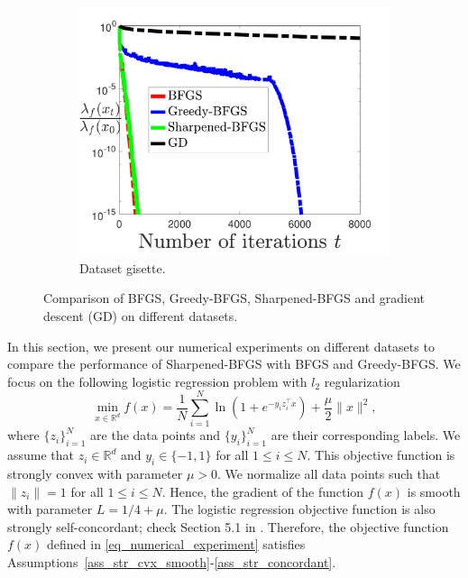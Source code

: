 \documentclass[11pt]{article}
\numberwithin{assumption}{section}
\numberwithin{remark}{section}
\numberwithin{theorem}{section}
\begin{document}
\begin{figure}
\begin{subfigure}{0.32\textwidth}
    \includegraphics[width=\textwidth]{Figures/gisette.pdf}
    \caption{Dataset gisette.}
\end{subfigure}
\caption{Comparison of BFGS, Greedy-BFGS, Sharpened-BFGS and gradient descent (GD) on different datasets.}
\label{all_plots}
\end{figure}

In this section, we present our numerical experiments on different datasets to compare the performance of Sharpened-BFGS with BFGS and Greedy-BFGS. We focus on the following logistic regression problem with $l_2$ regularization
\begin{equation}\label{eq_numerical_experiment}
    \min_{x \in \mathbb{R}^d} f(x) = \frac{1}{N}\sum_{i = 1}^{N}\ln{(1 + e^{-y_i z_i^\top x})} + \frac{\mu}{2}\|x\|^2,
\end{equation}
where $\{z_i\}_{i = 1}^{N}$ are the data points and $\{y_i\}_{i = 1}^{N}$ are their corresponding labels. We assume that $z_i \in \mathbb{R}^d$ and $y_i \in \{-1, 1\}$ for all $1 \leq i \leq N$. This objective function is strongly convex with parameter $\mu > 0$. We normalize all data points such that $\|z_i\| = 1$ for all $1 \leq i \leq N$. Hence, the gradient of the function $f(x)$ is smooth with parameter $L = 1/4 + \mu$. The logistic regression objective function is also strongly self-concordant; check Section 5.1 in \cite{rodomanov2020greedy}. Therefore, the objective function $f(x)$ defined in \eqref{eq_numerical_experiment} satisfies Assumptions~\ref{ass_str_cvx_smooth}-\ref{ass_str_concordant}.
\end{document}
